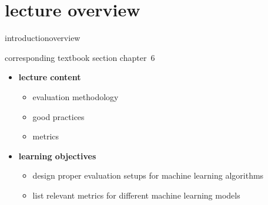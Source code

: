 


\subtitle{module 6.0: evaluation and metrics}


	

    \section[overview]{lecture overview}
        \begin{frame}{introduction}{overview}
            \begin{block}{corresponding textbook section}
                    chapter~6
            \end{block}

            \begin{itemize}
                \item   \textbf{lecture content}
                    \begin{itemize}
                        \item   evaluation methodology
                        \item   good practices
                        \item   metrics
                    \end{itemize}
                \bigskip
                \item<2->   \textbf{learning objectives}
                    \begin{itemize}
                        \item   design proper evaluation setups for machine learning algorithms
                        \item   list relevant metrics for different machine learning models
                    \end{itemize}
            \end{itemize}
        \end{frame}

